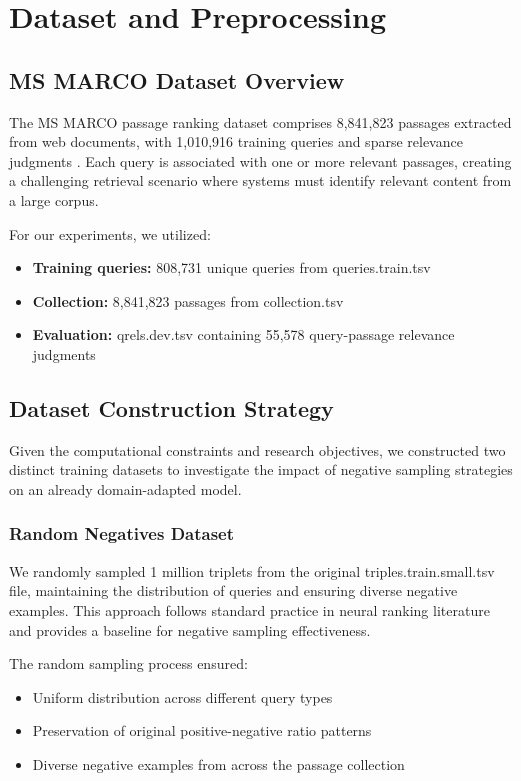 \section{Dataset and Preprocessing}

\subsection{MS MARCO Dataset Overview}

The MS MARCO passage ranking dataset comprises 8,841,823 passages extracted from web documents, with 1,010,916 training queries and sparse relevance judgments \cite{msmarco}. Each query is associated with one or more relevant passages, creating a challenging retrieval scenario where systems must identify relevant content from a large corpus.

For our experiments, we utilized:
\begin{itemize}
\item \textbf{Training queries:} 808,731 unique queries from queries.train.tsv
\item \textbf{Collection:} 8,841,823 passages from collection.tsv
\item \textbf{Evaluation:} qrels.dev.tsv containing 55,578 query-passage relevance judgments
\end{itemize}

\subsection{Dataset Construction Strategy}

Given the computational constraints and research objectives, we constructed two distinct training datasets to investigate the impact of negative sampling strategies on an already domain-adapted model.

\subsubsection{Random Negatives Dataset}

We randomly sampled 1 million triplets from the original triples.train.small.tsv file, maintaining the distribution of queries and ensuring diverse negative examples. This approach follows standard practice in neural ranking literature and provides a baseline for negative sampling effectiveness.

The random sampling process ensured:
\begin{itemize}
\item Uniform distribution across different query types
\item Preservation of original positive-negative ratio patterns
\item Diverse negative examples from across the passage collection
\end{itemize}

